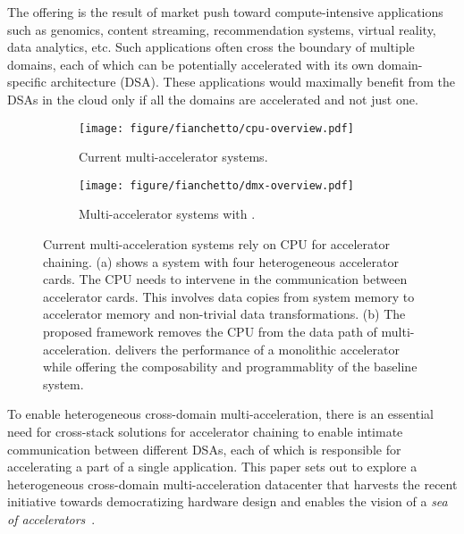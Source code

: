 The offering is the result of market push toward compute-intensive applications such as genomics, content streaming, recommendation systems, virtual reality, data analytics, etc. 
%
%
Such applications often cross the boundary of multiple domains, each of which can be potentially accelerated with its own domain-specific architecture (DSA). 
%
These applications would maximally benefit from the DSAs in the cloud only if all the domains are accelerated and not just one. 
%

%
\begin{figure}[t]
    \centering
    \begin{subfigure}[b]{\columnwidth}
    \texttt{[image: figure/fianchetto/cpu-overview.pdf]}
    \caption{Current multi-accelerator systems.}
    \label{fig:overview:current}
    \end{subfigure}
    \hspace{0.5in}
    \begin{subfigure}[b]{\columnwidth}
    \texttt{[image: figure/fianchetto/dmx-overview.pdf]}
    \caption{Multi-accelerator systems with \dmx.}
    \label{fig:overview:dmx}
    \end{subfigure}
    \caption{Current multi-acceleration systems rely on CPU for accelerator chaining. (a) shows a system with four heterogeneous accelerator cards. The CPU needs to intervene in the communication between accelerator cards. This involves data copies from system memory to accelerator memory and non-trivial data transformations. (b) The proposed \dmx framework removes the CPU from the data path of multi-acceleration. \dmx delivers the performance of a monolithic accelerator while offering the composability and programmablity of the baseline system.}
    \vspace{-3ex}
    
    \label{fig:overview}
    \end{figure}

To enable heterogeneous cross-domain multi-acceleration, there is an essential need for cross-stack solutions for accelerator chaining to enable intimate communication between different DSAs, each of which is responsible for accelerating a part of a single application. 
%
This paper sets out to explore a heterogeneous cross-domain multi-acceleration datacenter that harvests the recent initiative towards democratizing hardware design and enables the vision of a \textit{sea of accelerators}~\cite{pymtl-2020,taylor-basejump,BlackParrot,cong-democratizing, gonzalez-2023-profiling}.

